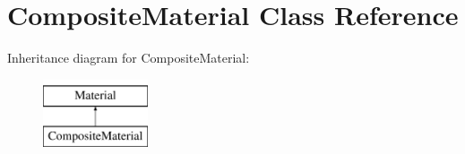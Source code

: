 \hypertarget{classCompositeMaterial}{}\section{Composite\+Material Class Reference}
\label{classCompositeMaterial}
Inheritance diagram for Composite\+Material\+:\begin{figure}[H]
\begin{center}
\leavevmode
\includegraphics[height=2.000000cm]{classCompositeMaterial}
\end{center}
\end{figure}
